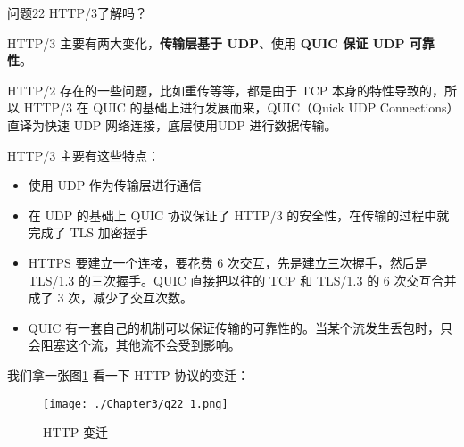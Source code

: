 \documentclass[cn,11pt,color=blue,lang=cn]{elegantbook}
\begin{document}
\begin{custom}{问题22}
HTTP/3了解吗？
\end{custom}
\begin{solution}

HTTP/3 主要有两大变化，\textbf{传输层基于 UDP}、使用 \textbf{QUIC 保证 UDP 可靠性}。

HTTP/2 存在的一些问题，比如重传等等，都是由于 TCP 本身的特性导致的，所以 HTTP/3 在 QUIC 的基础上进行发展而来，QUIC（Quick UDP Connections）直译为快速 UDP 网络连接，底层使用UDP 进行数据传输。

HTTP/3 主要有这些特点：

\begin{itemize}
	\item 使用 UDP 作为传输层进行通信
	\item 在 UDP 的基础上 QUIC 协议保证了 HTTP/3 的安全性，在传输的过程中就完成了 TLS 加密握手
	\item HTTPS 要建立一个连接，要花费 6 次交互，先是建立三次握手，然后是 TLS/1.3 的三次握手。QUIC 直接把以往的 TCP 和 TLS/1.3 的 6 次交互合并成了 3 次，减少了交互次数。
	\item QUIC 有一套自己的机制可以保证传输的可靠性的。当某个流发生丢包时，只会阻塞这个流，其他流不会受到影响。
\end{itemize}

我们拿一张图\ref{fig22_1} 看一下 HTTP 协议的变迁：
\begin{figure}[htbp]
\centering
\texttt{[image: ./Chapter3/q22\_1.png]}
\caption{HTTP 变迁}
\label{fig22_1}
\end{figure}
\end{solution}
\end{document}

